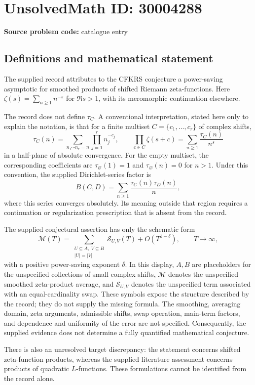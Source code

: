 \documentclass[11pt]{article}
\begin{document}
\section*{UnsolvedMath ID: 30004288}
\textbf{Source problem code:} catalogue entry
\subsection{Definitions and mathematical statement}
The supplied record attributes to the CFKRS conjecture a power-saving asymptotic for smoothed products of shifted Riemann zeta-functions. Here \(\zeta(s)=\sum_{n\geq1}n^{-s}\) for \(\Re s>1\), with its meromorphic continuation elsewhere.

The record does not define \(\tau_C\). A conventional interpretation, stated here only to explain the notation, is that for a finite multiset \(C=\{c_1,\ldots,c_r\}\) of complex shifts,
\[
\tau_C(n)=\sum_{n_1\cdots n_r=n}\prod_{j=1}^{r}n_j^{-c_j},
\qquad
\prod_{c\in C}\zeta(s+c)=\sum_{n\geq1}\frac{\tau_C(n)}{n^s}
\]
in a half-plane of absolute convergence. For the empty multiset, the corresponding coefficients are \(\tau_{\varnothing}(1)=1\) and \(\tau_{\varnothing}(n)=0\) for \(n>1\). Under this convention, the supplied Dirichlet-series factor is
\[
B(C,D)=\sum_{n\geq1}\frac{\tau_C(n)\tau_D(n)}{n},
\]
where this series converges absolutely. Its meaning outside that region requires a continuation or regularization prescription that is absent from the record.

The supplied conjectural assertion has only the schematic form
\[
\mathcal M(T)
=
\sum_{\substack{U\subseteq A,\ V\subseteq B\\ |U|=|V|}}
\mathcal S_{U,V}(T)
+O\!\left(T^{1-\delta}\right),
\qquad T\to\infty,
\]
with a positive power-saving exponent \(\delta\). In this display, \(A,B\) are placeholders for the unspecified collections of small complex shifts, \(\mathcal M\) denotes the unspecified smoothed zeta-product average, and \(\mathcal S_{U,V}\) denotes the unspecified term associated with an equal-cardinality swap. These symbols expose the structure described by the record; they do not supply the missing formula. The smoothing, averaging domain, zeta arguments, admissible shifts, swap operation, main-term factors, and dependence and uniformity of the error are not specified. Consequently, the supplied evidence does not determine a fully quantified mathematical conjecture.

There is also an unresolved target discrepancy: the statement concerns shifted zeta-function products, whereas the supplied literature assessment concerns products of quadratic \(L\)-functions. These formulations cannot be identified from the record alone.
\end{document}
